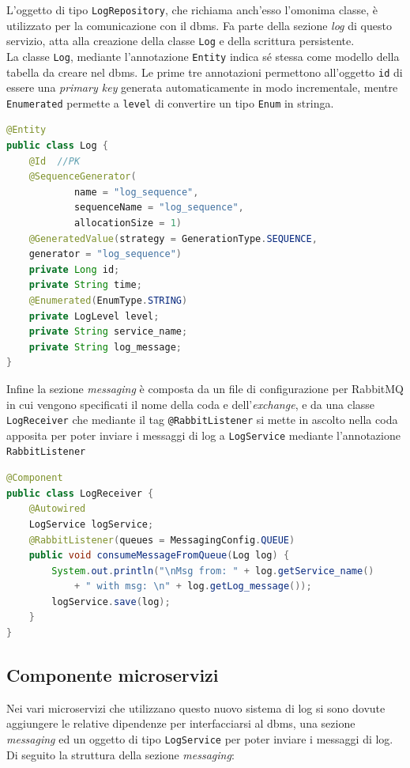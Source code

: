 L'oggetto di tipo \texttt{LogRepository}, che richiama anch'esso l'omonima classe, è utilizzato per la comunicazione con il \gls{dbms}. Fa parte della sezione \textit{log} di questo servizio, atta alla creazione della classe \texttt{Log} e della scrittura persistente.\\
La classe \texttt{Log}, mediante l'annotazione \texttt{Entity} indica sé stessa come modello della tabella da creare nel \gls{dbms}. Le prime tre annotazioni permettono all'oggetto \texttt{id} di essere una \textit{primary key} generata automaticamente in modo incrementale, mentre \texttt{Enumerated} permette a \texttt{level} di convertire un tipo \texttt{Enum} in stringa.
\begin{lstlisting}[language=Java, caption=Frammento della classe Log, basicstyle=\footnotesize]
@Entity
public class Log {
    @Id  //PK
    @SequenceGenerator(
            name = "log_sequence",
            sequenceName = "log_sequence",
            allocationSize = 1)
    @GeneratedValue(strategy = GenerationType.SEQUENCE,
    generator = "log_sequence")
    private Long id;
    private String time;
    @Enumerated(EnumType.STRING)
    private LogLevel level;
    private String service_name;
    private String log_message;
}
\end{lstlisting}
Infine la sezione \textit{messaging} è composta da un file di configurazione per RabbitMQ in cui vengono specificati il nome della coda e dell'\textit{exchange}, e da una classe \texttt{LogReceiver} che mediante il tag \texttt{@RabbitListener} si mette in ascolto nella coda apposita per poter inviare i messaggi di log a \texttt{LogService} mediante l'annotazione \texttt{RabbitListener}
\begin{lstlisting}[language=Java, caption=Classe LogReceiver, basicstyle=\footnotesize]
@Component
public class LogReceiver {
    @Autowired
    LogService logService;
    @RabbitListener(queues = MessagingConfig.QUEUE)
    public void consumeMessageFromQueue(Log log) {
        System.out.println("\nMsg from: " + log.getService_name()
            + " with msg: \n" + log.getLog_message());
        logService.save(log);
    }
}
\end{lstlisting}

\subsection{Componente microservizi}

Nei vari microservizi che utilizzano questo nuovo sistema di log si sono dovute aggiungere le relative dipendenze per interfacciarsi al \acrlong{dbms}, una sezione \textit{messaging} ed un oggetto di tipo \texttt{LogService} per poter inviare i messaggi di log.
Di seguito la struttura della sezione \textit{messaging}:
\begin{flushleft}
\end{flushleft}

